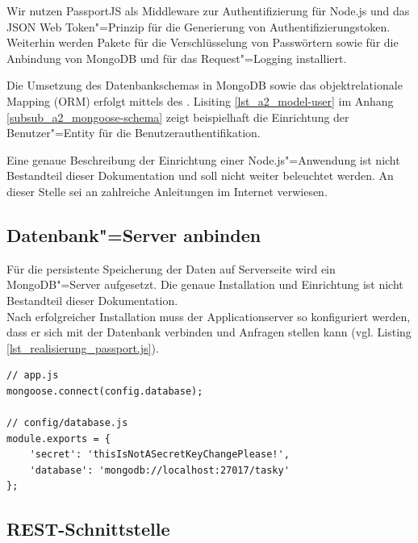 Wir nutzen \glqq PassportJS\grqq{} als Middleware zur Authentifizierung für Node.js und das \glqq JSON Web Token\grqq "=Prinzip für die Generierung von Authentifizierungstoken. Weiterhin werden Pakete für die Verschlüsselung von Passwörtern sowie für die Anbindung von MongoDB und  für das Request"=Logging installiert.

Die Umsetzung des Datenbankschemas in MongoDB sowie das objektrelationale Mapping (ORM) erfolgt mittels des  . Lisiting \ref{lst_a2_model-user} im Anhang \ref{subsub_a2_mongoose-schema} zeigt beispielhaft die Einrichtung der Benutzer"=Entity für die Benutzerauthentifikation. 

Eine genaue Beschreibung der Einrichtung einer Node.js"=Anwendung ist nicht Bestandteil dieser Dokumentation und soll nicht weiter beleuchtet werden. An dieser Stelle sei an zahlreiche Anleitungen im Internet verwiesen.

\subsection{Datenbank"=Server anbinden}
\label{subsec_implementierung_datenbank}

Für die persistente Speicherung der Daten auf Serverseite wird ein MongoDB"=Server aufgesetzt. Die genaue Installation und Einrichtung ist nicht Bestandteil dieser Dokumentation. \\
Nach erfolgreicher Installation muss der Applicationserver so konfiguriert werden, dass er sich mit der Datenbank verbinden und Anfragen stellen kann (vgl. Listing \ref{lst_realisierung_passport.js}).

\begin{lstlisting}[caption={Verbindung zur Datenbank konfigurieren},label={lst_realisierung_passport.js}, frame=single]
// app.js 
mongoose.connect(config.database);

// config/database.js
module.exports = {
    'secret': 'thisIsNotASecretKeyChangePlease!',
    'database': 'mongodb://localhost:27017/tasky'
};
\end{lstlisting}


\subsection{REST-Schnittstelle}

